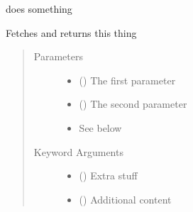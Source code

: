 \documentclass[letterpaper,10pt,english]{sphinxmanual}
\begin{document}

\begin{fulllineitems}
\label{\detokenize{trading:trading.a1.a1_func}}
does something

\end{fulllineitems}


\begin{fulllineitems}
\label{\detokenize{trading:trading.a1.complex_number}}
Fetches and returns this thing
\begin{quote}\begin{description}
\item[{Parameters}] \leavevmode\begin{itemize}
\item {} 
 () \textendash{} The first parameter

\item {} 
 () \textendash{} The second parameter

\item {} 
 \textendash{} See below

\end{itemize}

\item[{Keyword Arguments}] \leavevmode\begin{itemize}
\item {} 
 () \textendash{}
Extra stuff

\item {} 
 () \textendash{}
Additional content

\end{itemize}

\end{description}\end{quote}

\end{fulllineitems}
\end{document}

